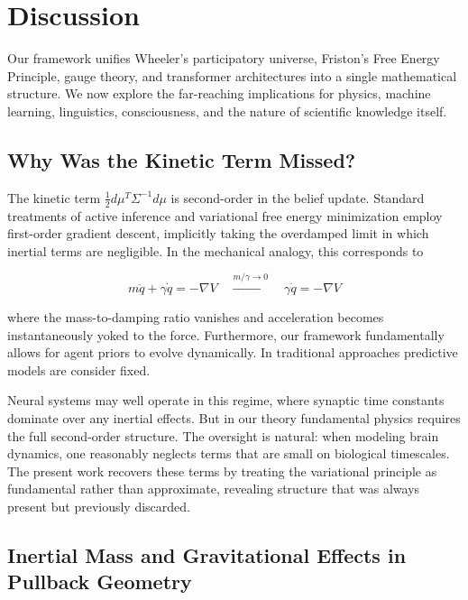 \documentclass[11pt]{article}
\begin{document}
\section{Discussion}
\label{sec:implications}

Our framework unifies Wheeler's participatory universe, Friston's Free Energy Principle, gauge theory, and transformer architectures into a single mathematical structure. We now explore the far-reaching implications for physics, machine learning, linguistics, consciousness, and the nature of scientific knowledge itself.


\subsection{Why Was the Kinetic Term Missed?}

The kinetic term $\frac{1}{2}d\mu^T \Sigma^{-1} d\mu$ is second-order in the belief update. Standard treatments of active inference and variational free energy minimization employ first-order gradient descent, implicitly taking the overdamped limit in which inertial terms are negligible. In the mechanical analogy, this corresponds to

\begin{equation}
m\ddot{q} + \gamma\dot{q} = -\nabla V \quad \xrightarrow{m/\gamma \to 0} \quad \gamma\dot{q} = -\nabla V
\end{equation}

where the mass-to-damping ratio vanishes and acceleration becomes instantaneously yoked to the force. Furthermore, our framework fundamentally allows for agent priors to evolve dynamically.  In traditional approaches predictive models are consider fixed. 

Neural systems may well operate in this regime, where synaptic time constants dominate over any inertial effects. But in our theory fundamental physics requires the full second-order structure. The oversight is natural: when modeling brain dynamics, one reasonably neglects terms that are small on biological timescales. The present work recovers these terms by treating the variational principle as fundamental rather than approximate, revealing structure that was always present but previously discarded. 



\subsection{Inertial Mass and Gravitational Effects in Pullback Geometry}
\end{document}
